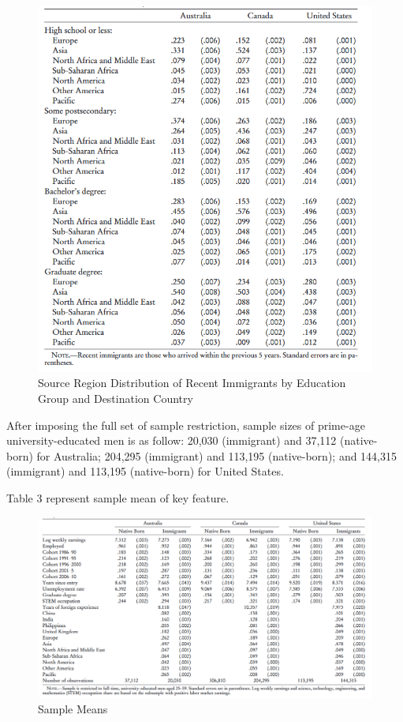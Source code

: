\documentclass[../root]{subfiles}
\begin{document}
    
    \begin{figure}
        \centering
        \includegraphics[width = \linewidth]{0828sugiyama/Table_2.png}
        \caption{Source Region Distribution of Recent Immigrants by Education Group and Destination Country}
        \label{fig:my_label}
    \end{figure}
    
    After imposing the full set of sample restriction, sample sizes of prime-age university-educated men is as follow: 20,030 (immigrant) and 37,112 (native-born) for Australia; 204,295 (immigrant) and 113,195 (native-born); and 144,315 (immigrant) and 113,195 (native-born) for United States.
    
    Table 3 represent sample mean of key feature.
    \begin{figure}
        \centering
        \includegraphics[width = \linewidth]{0828sugiyama/Table_3.png}
        \caption{Sample Means}
        \label{fig:my_label}
    \end{figure}
    
\end{document}
